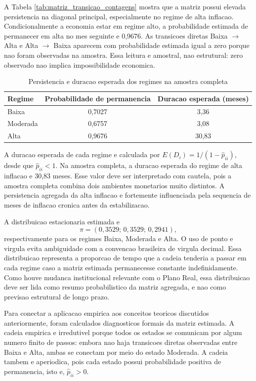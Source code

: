 A Tabela \ref{tab:matriz_transicao_contagens} mostra que a matriz possui elevada persistencia na diagonal principal, especialmente no regime de alta inflacao. Condicionalmente a economia estar em regime alto, a probabilidade estimada de permanecer em alta no mes seguinte e 0,9676. As transicoes diretas Baixa \(\rightarrow\) Alta e Alta \(\rightarrow\) Baixa aparecem com probabilidade estimada igual a zero porque nao foram observadas na amostra. Essa leitura e amostral, nao estrutural: zero observado nao implica impossibilidade economica.

\begin{table}[H]
\centering
\caption{Persistencia e duracao esperada dos regimes na amostra completa}
\label{tab:persistencia_global}
\begin{tabular}{lcc}
\hline
Regime & Probabilidade de permanencia & Duracao esperada (meses) \\
\hline
Baixa    & 0,7027 & 3,36 \\
Moderada & 0,6757 & 3,08 \\
Alta     & 0,9676 & 30,83 \\
\hline
\end{tabular}
\end{table}

A duracao esperada de cada regime e calculada por \(E(D_i)=1/(1-\widehat{p}_{ii})\), desde que \(\widehat{p}_{ii}<1\). Na amostra completa, a duracao esperada do regime de alta inflacao e 30,83 meses. Esse valor deve ser interpretado com cautela, pois a amostra completa combina dois ambientes monetarios muito distintos. A persistencia agregada da alta inflacao e fortemente influenciada pela sequencia de meses de inflacao cronica antes da estabilizacao.

A distribuicao estacionaria estimada e
\[
\pi=(0,3529;\,0,3529;\,0,2941),
\]
respectivamente para os regimes Baixa, Moderada e Alta. O uso de ponto e virgula evita ambiguidade com a convencao brasileira de virgula decimal. Essa distribuicao representa a proporcao de tempo que a cadeia tenderia a passar em cada regime caso a matriz estimada permanecesse constante indefinidamente. Como houve mudanca institucional relevante com o Plano Real, essa distribuicao deve ser lida como resumo probabilistico da matriz agregada, e nao como previsao estrutural de longo prazo.

Para conectar a aplicacao empirica aos conceitos teoricos discutidos anteriormente, foram calculados diagnosticos formais da matriz estimada. A cadeia empirica e irredutivel porque todos os estados se comunicam por algum numero finito de passos: embora nao haja transicoes diretas observadas entre Baixa e Alta, ambas se conectam por meio do estado Moderada. A cadeia tambem e aperiodica, pois cada estado possui probabilidade positiva de permanencia, isto e, \(\widehat{p}_{ii}>0\).

